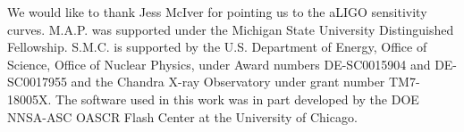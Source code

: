 \documentclass[twocolumn,times]{aastex62}  %
\begin{document}
\acknowledgements

We would like to thank Jess McIver for pointing us to the aLIGO sensitivity curves.  M.A.P. was supported under the Michigan State University Distinguished Fellowship. 
S.M.C. is supported by the U.S. Department of Energy, Office of Science, Office of Nuclear Physics,
under Award numbers DE-SC0015904 and DE-SC0017955 and the Chandra
X-ray Observatory under grant number TM7-18005X.
The software used in this
work was in part developed by the DOE NNSA-ASC OASCR Flash Center at
the University of Chicago.  

    





\end{document}
